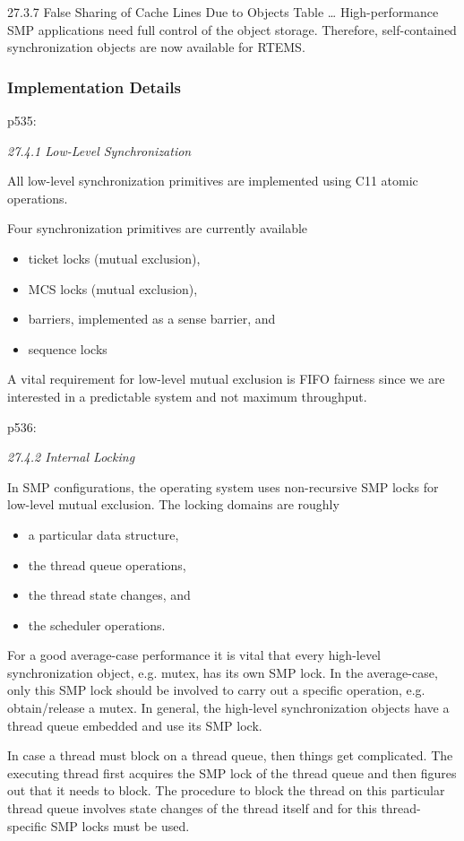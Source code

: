 27.3.7 False Sharing of Cache Lines Due to Objects Table
\dots
High-performance SMP applications need full control of the object storage.
Therefore,
self-contained synchronization objects are now available for RTEMS.

\subsubsection{Implementation Details}

p535:

\emph{27.4.1 Low-Level Synchronization}

All low-level synchronization primitives are implemented
using C11 atomic operations.

Four synchronization primitives are currently available
\begin{itemize}
  \item ticket locks (mutual exclusion),
  \item MCS locks (mutual exclusion),
  \item barriers, implemented as a sense barrier, and
  \item sequence locks
\end{itemize}

A vital requirement for low-level mutual exclusion is FIFO fairness
since we are interested in a predictable system and not maximum throughput.

p536:

\emph{27.4.2 Internal Locking}

In SMP configurations, the operating system uses non-recursive SMP locks for low-level mutual
exclusion. The locking domains are roughly
\begin{itemize}
  \item a particular data structure,
  \item the thread queue operations,
  \item the thread state changes, and
  \item the scheduler operations.
\end{itemize}

For a good average-case performance it is vital that every high-level
synchronization object,
e.g. mutex,
has its own SMP lock.
In the average-case,
only this SMP lock should be involved to carry out a specific operation,
e.g. obtain/release a mutex.
In general,
the high-level synchronization objects have a thread queue embedded and use its
SMP lock.

In case a thread must block on a thread queue,
then things get complicated.
The executing thread first acquires the SMP lock of the thread queue
and then figures out that it needs to block.
The procedure to block the thread on this particular thread queue
involves state changes of the thread itself
and for this thread-specific SMP locks must be used.

